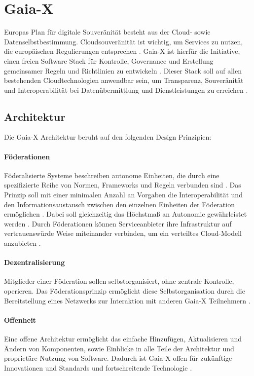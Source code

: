 \section{Gaia-X}
\label{sec:grundlagen:gaia-x}
Europas Plan für digitale Souveränität besteht aus der Cloud- sowie Datenselbstbestimmung.
Cloudsouveränität ist wichtig, um Services zu nutzen, die europäischen Regulierungen entsprechen \cite{Braud2021}.
Gaia-X ist hierfür die Initiative, einen freien Software Stack für Kontrolle, Governance und Erstellung gemeinsamer
Regeln und Richtlinien zu entwickeln \cite{Bonfiglio2021}. 
Dieser Stack soll auf allen bestehenden Cloudtechnologien anwendbar sein, um Transparenz, Souveränität und 
Interoperabilität bei Datenübermittlung und Dienstleistungen zu erreichen \cite{Bonfiglio2021}.

\subsection{Architektur}
\label{subsec:gaia-x:architektur}
Die Gaia-X Architektur beruht auf den folgenden Design Prinzipien:

\paragraph{Föderationen}
Föderalisierte Systeme beschreiben autonome Einheiten, die durch eine spezifizierte Reihe von Normen,
Frameworks und Regeln verbunden sind \cite{GaiaXArchitecture2021}.
Das Prinzip soll mit einer minimalen Anzahl an Vorgaben die Interoperabilität und den Informationsaustausch
zwischen den einzelnen Einheiten der Föderation ermöglichen \cite{GaiaXArchitecture2021}. 
Dabei soll gleichzeitig das Höchstmaß an Autonomie gewährleistet werden \cite{GaiaXArchitecture2021}.
Durch Föderationen können Serviceanbieter ihre Infrastruktur auf vertrauenswürde Weise miteinander verbinden,
um ein verteiltes Cloud-Modell anzubieten \cite{Bonfiglio2021}.

\paragraph{Dezentralisierung}
Mitglieder einer Föderation sollen selbstorganisiert, ohne zentrale Kontrolle, operieren.
Das Föderationsprinzip ermöglicht diese Selbstorganisation durch die Bereitstellung eines Netzwerks
zur Interaktion mit anderen Gaia-X Teilnehmern \cite{GaiaXArchitecture2021}.

\paragraph{Offenheit}
Eine offene Architektur ermöglicht das einfache Hinzufügen, Aktualisieren und Ändern von Komponenten, sowie
Einblicke in alle Teile der Architektur und proprietäre Nutzung von Software.
Dadurch ist Gaia-X offen für zukünftige Innovationen und Standards und fortschreitende Technologie \cite{GaiaXArchitecture2021}.

